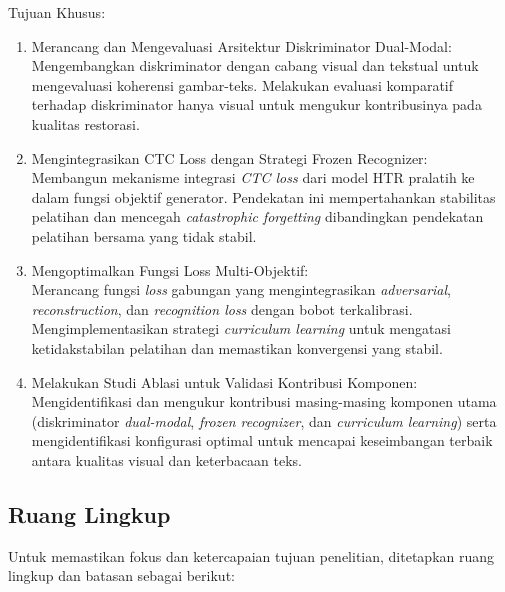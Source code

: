 \documentclass[12pt,a4paper]{article}
\begin{document}
Tujuan Khusus:

\begin{enumerate}[label=\alph*., leftmargin=1.5em, labelsep=0.5em, itemindent=0pt, noitemsep, topsep=0pt]
      \item Merancang dan Mengevaluasi Arsitektur Diskriminator Dual-Modal: \\
            Mengembangkan diskriminator dengan cabang visual dan tekstual untuk mengevaluasi koherensi gambar-teks. Melakukan evaluasi komparatif terhadap diskriminator hanya visual untuk mengukur kontribusinya pada kualitas restorasi.

      \item Mengintegrasikan CTC Loss dengan Strategi Frozen Recognizer: \\
            Membangun mekanisme integrasi \textit{CTC loss} dari model HTR pralatih ke dalam fungsi objektif generator. Pendekatan ini mempertahankan stabilitas pelatihan dan mencegah \textit{catastrophic forgetting} dibandingkan pendekatan pelatihan bersama yang tidak stabil.

      \item Mengoptimalkan Fungsi Loss Multi-Objektif: \\
            Merancang fungsi \textit{loss} gabungan yang mengintegrasikan \textit{adversarial}, \textit{reconstruction}, dan \textit{recognition loss} dengan bobot terkalibrasi. Mengimplementasikan strategi \textit{curriculum learning} untuk mengatasi ketidakstabilan pelatihan dan memastikan konvergensi yang stabil.

      \item Melakukan Studi Ablasi untuk Validasi Kontribusi Komponen: \\
            Mengidentifikasi dan mengukur kontribusi masing-masing komponen utama (diskriminator \textit{dual-modal}, \textit{frozen recognizer}, dan \textit{curriculum learning}) serta mengidentifikasi konfigurasi optimal untuk mencapai keseimbangan terbaik antara kualitas visual dan keterbacaan teks.
\end{enumerate}

\subsection{Ruang Lingkup}
\label{subsec:ruang-lingkup}

Untuk memastikan fokus dan ketercapaian tujuan penelitian, ditetapkan ruang lingkup dan batasan sebagai berikut:
\end{document}
